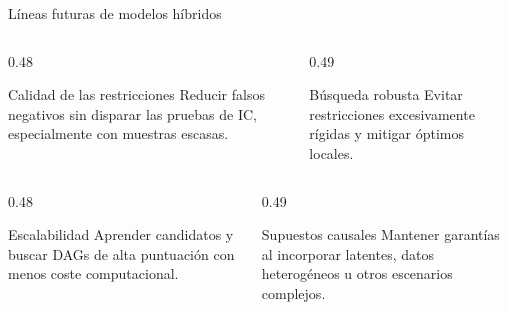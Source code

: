 \documentclass[aspectratio=169,11pt]{beamer}
\begin{document}
\begin{frame}[t]{Líneas futuras de modelos híbridos}

  \begin{columns}[T,onlytextwidth]
    \begin{column}{0.48\textwidth}
      \begin{block}{Calidad de las restricciones}
        Reducir falsos negativos sin disparar las pruebas
        de IC, especialmente con muestras escasas.
      \end{block}
    \end{column}

    \begin{column}{0.49\textwidth}
      \begin{block}{Búsqueda robusta}
        Evitar restricciones excesivamente rígidas
        y mitigar óptimos locales.
      \end{block}
    \end{column}
  \end{columns}

  \vspace{0.15cm}

  \begin{columns}[T,onlytextwidth]
    \begin{column}{0.48\textwidth}
      \begin{block}{Escalabilidad}
        Aprender candidatos y buscar DAGs de alta
        puntuación con menos coste computacional.
      \end{block}
    \end{column}

    \begin{column}{0.49\textwidth}
      \begin{block}{Supuestos causales}
        Mantener garantías al incorporar latentes,
        datos heterogéneos u otros escenarios complejos.
      \end{block}
    \end{column}
  \end{columns}

  \vfill

  \vspace{0.1cm}

\end{frame}
\end{document}
